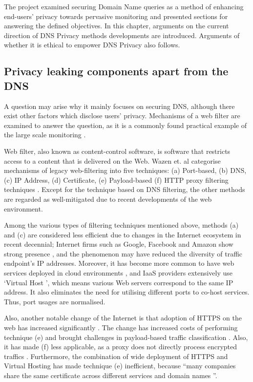 The project examined securing Domain Name queries as a method of enhancing end-users' privacy towards pervasive monitoring and presented sections for answering the defined objectives. In this chapter, arguments on the current direction of DNS Privacy methods developments are introduced. Arguments of whether it is ethical to empower DNS Privacy also follows.

\subsection{Privacy leaking components apart from the DNS}
A question may arise why it mainly focuses on securing DNS, although there exist other factors which disclose users' privacy.
Mechanisms of a web filter are examined to answer the question, as it is a commonly found practical example of the large scale monitoring \cite{murdoch2008tools}.

Web filter, also known as content-control software, is software that restricts access to a content that is delivered on the Web.
Wazen et. al categorise mechanisms of legacy web-filtering into five techniques: (a) Port-based, (b) DNS, (c) IP Address, (d) Certificate, (e) Payload-based (f) HTTP proxy filtering techniques \cite{shbair2015efficiently}.
Except for the technique based on DNS filtering, the other methods are regarded as well-mitigated due to recent developments of the web environment. 

Among the various types of filtering techniques mentioned above, methods (a) and (c) are considered less efficient due to changes in the Internet ecosystem in recent decennial;
Internet firms such as Google, Facebook and Amazon show strong presence \cite{haucap2014google}, and the phenomenon may have reduced the diversity of traffic endpoint's IP addresses.
Moreover, it has become more common to have web services deployed in cloud environments \cite{clouds2018stat}, and IaaS providers extensively use `Virtual Host \cite{virtual24host}', which means various Web servers correspond to the same IP address.
It also eliminates the need for utilising different ports to co-host services. Thus, port usages are normalised.

Also, another notable change of the Internet is that adoption of HTTPS on the web has increased significantly \cite{felt2017measuring}.
The change has increased costs of performing technique (e) and brought challenges in payload-based traffic classification \cite{xue2013traffic}.
Also, it has made (f) less applicable, as a proxy does not directly process encrypted traffics \cite{shbair2015efficiently}.
Furthermore, the combination of wide deployment of HTTPS and Virtual Hosting has made technique (e) inefficient, because ``many companies share the same certificate across different services and domain names \cite{shbair2015efficiently}''.


